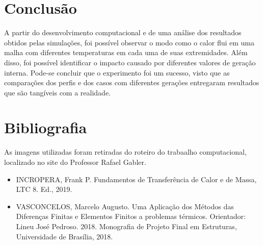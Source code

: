 \documentclass[article]{abntex2}
\begin{document}
\section{Conclusão}
A partir do desenvolvimento computacional e de uma análise dos resultados obtidos pelas simulações, foi possível observar o modo como o calor flui em uma malha com diferentes temperaturas em cada uma de suas extremidades. Além disso, foi possível identificar o impacto causado por diferentes valores de geração interna. 
Pode-se concluir que o experimento foi um sucesso, visto que as comparações dos perfis e dos casos com diferentes gerações entregaram resultados que são tangíveis com a realidade. 

\section{Bibliografia}
As imagens utilizadas foram retiradas do roteiro do trabaalho computacional, localizado no site do Professor Rafael Gabler.
\newline

\begin{itemize}
    \item INCROPERA, Frank P. Fundamentos de Transferência de Calor e de Massa, LTC 8. Ed., 2019.
    \item VASCONCELOS, Marcelo Augusto. Uma Aplicação dos Métodos das Diferenças Finitas e Elementos Finitos a problemas térmicos. Orientador: Lineu José Pedroso. 2018. Monografia de Projeto Final em Estruturas, Universidade de Brasília, 2018.
\end{itemize}
\end{document}
